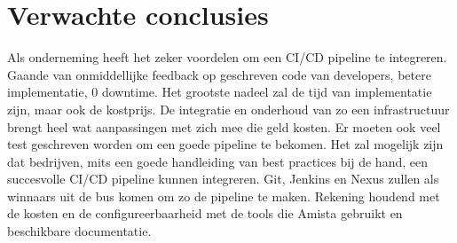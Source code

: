     \section{Verwachte conclusies}
    \label{sec:verwachte_conclusies}
    
    Als onderneming heeft het zeker voordelen om een CI/CD pipeline te integreren. Gaande van onmiddellijke feedback op geschreven code van developers, betere implementatie, 0 downtime. Het grootste nadeel zal de tijd van implementatie zijn, maar ook de kostprijs. De integratie en onderhoud van zo een infrastructuur brengt heel wat aanpassingen met zich mee die geld kosten. Er moeten ook veel test geschreven worden om een goede pipeline te bekomen.
    Het zal mogelijk zijn dat bedrijven, mits een goede handleiding van best practices bij de hand, een succesvolle CI/CD pipeline kunnen integreren.
    Git, Jenkins en Nexus zullen als winnaars uit de bus komen om zo de pipeline te maken. Rekening houdend met de kosten en de configureerbaarheid met de tools die Amista gebruikt en beschikbare documentatie.
